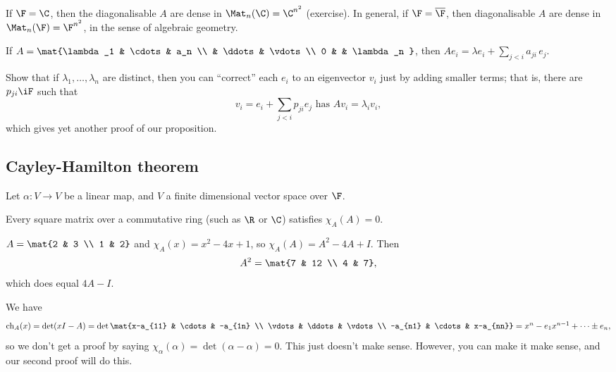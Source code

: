 \begin{remark}
	If $\F=\C$, then the diagonalisable $A$ are dense in $\Mat_n(\C)=\C^{n^2}$ (exercise). In general, if $\F=\overline{\F}$, then diagonalisable $A$ are dense in $\Mat_n(\F)=\F^{n^2}$, in the sense of algebraic geometry. %
\end{remark}

\begin{exercise}
	If $A=\mat{\lambda_1  &   \cdots & a_n \\ & \ddots & \vdots \\ 0 & & \lambda_n }$, then $Ae_i=\lambda e_i+\sum_{j<i} a_{ji} \, e_j$. %
	
	Show that if $\lambda_1,\ldots,\lambda_n$ are distinct, then you can ``correct'' each $e_i$ to an eigenvector $v_i$ just by adding smaller terms; that is, there are $p_{ji}\iF$ such that %
	\begin{equation*}
		v_i = e_i + \sum_{j<i} p_{ji} e_j \text{ has } Av_i = \lambda_i v_i,
	\end{equation*}
	which gives yet another proof of our proposition.
\end{exercise}


	\pagebreak

\subsection{Cayley-Hamilton theorem} %
\label{sub:cayley_hamilton_theorem}

Let $\alpha:V\to V$ be a linear map, and $V$ a finite dimensional vector space over $\F$.

\begin{theorem}
	 Every square matrix over a commutative ring (such as $\R$ or $\C$) satisfies $\chi_A(A)=0$. %
\end{theorem}

\begin{example}
	$A=\mat{2 & 3 \\ 1 & 2}$ and $\chi_A(x)=x^2-4x+1$, so $\chi_A(A) = A^2-4A+I$. Then %
	\begin{equation*}
		A^2 = \mat{7 & 12 \\ 4 & 7},
	\end{equation*}
	which does equal $4A-I$.
\end{example}

\begin{remark}
	We have
	\begin{equation*}
		\chi_A(x) = \det(xI-A) = \det \mat{x-a_{11} & \cdots & -a_{1n} \\ \vdots & \ddots & \vdots \\ -a_{n1} & \cdots & x-a_{nn}} = x^n - e_1 x^{n-1} + \cdots \pm e_n, %
	\end{equation*}
	so we don't get a proof by saying $\chi_\alpha(\alpha)=\det(\alpha-\alpha)=0$. This just doesn't make sense. However, you can make it make sense, and our second proof will do this.  %
\end{remark}

